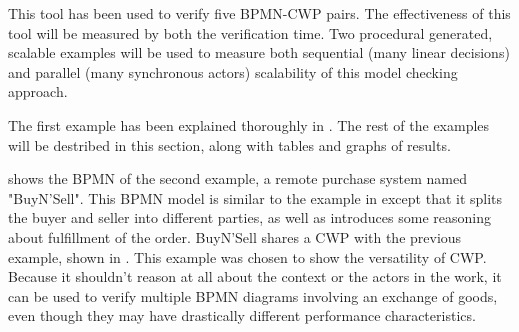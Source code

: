 This tool has been used to verify five BPMN-CWP pairs. The effectiveness of this tool will be measured by both the verification time. Two procedural generated, scalable examples will be used to measure both sequential (many linear decisions) and parallel (many synchronous actors) scalability of this model checking approach.

The first example has been explained thoroughly in . The rest of the examples will be destribed in this section, along with tables and graphs of results.

\begin{comment}
\figref{fig:face2face_bpmn} shows the BPMN of the first example, a face-to-face purchase. The Buyer and seller are condensed into a single actor for simplicity in this model. The purchase process involves negotiation periods for both the price and the terms. Once the price and terms are agreed upon, the model can proceed to the exchange and then exit. \figref{fig:purchase_cwp} shows the CWP for this purchase. The CWP has 5 states, of which 2 are goal states. It is the workflow's responsibility to either send the state of the CWP to "Purchase Failed" or to "Ownerships Switched". Note that even though "Purchase Failed" might not sound like a goal state, it is for purposes of verifying eventual termination.
\end{comment}


 shows the BPMN of the second example, a remote purchase system named "BuyN'Sell". This BPMN model is similar to the example in  except that it splits the buyer and seller into different parties, as well as introduces some reasoning about fulfillment of the order. BuyN'Sell shares a CWP with the previous example, shown in . This example was chosen to show the versatility of CWP. Because it shouldn't reason at all about the context or the actors in the work, it can be used to verify multiple BPMN diagrams involving an exchange of goods, even though they may have drastically different performance characteristics.

